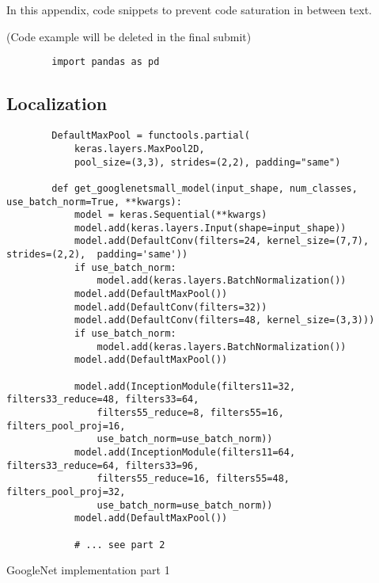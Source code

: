 \chapter{}%
\label{ch:code-snippets}


In this appendix, code snippets to prevent code saturation in between text.

(Code example will be deleted in the final submit)

\begin{listing}
    \begin{verbatim}
        import pandas as pd
    \end{verbatim}
    \caption[]{}
    \label{code:}
\end{listing}


\section{Localization}
\label{sec:code-localization}

\begin{listing}
    \begin{verbatim}
        DefaultMaxPool = functools.partial(
            keras.layers.MaxPool2D,
            pool_size=(3,3), strides=(2,2), padding="same")

        def get_googlenetsmall_model(input_shape, num_classes, use_batch_norm=True, **kwargs):
            model = keras.Sequential(**kwargs)
            model.add(keras.layers.Input(shape=input_shape))
            model.add(DefaultConv(filters=24, kernel_size=(7,7), strides=(2,2),  padding='same'))
            if use_batch_norm:
                model.add(keras.layers.BatchNormalization())
            model.add(DefaultMaxPool())
            model.add(DefaultConv(filters=32))
            model.add(DefaultConv(filters=48, kernel_size=(3,3)))
            if use_batch_norm:
                model.add(keras.layers.BatchNormalization())
            model.add(DefaultMaxPool())

            model.add(InceptionModule(filters11=32, filters33_reduce=48, filters33=64,
                filters55_reduce=8, filters55=16, filters_pool_proj=16,
                use_batch_norm=use_batch_norm))
            model.add(InceptionModule(filters11=64, filters33_reduce=64, filters33=96,
                filters55_reduce=16, filters55=48, filters_pool_proj=32,
                use_batch_norm=use_batch_norm))
            model.add(DefaultMaxPool())

            # ... see part 2
    \end{verbatim}
    \caption[GoogleNet implementation part 1]{GoogleNet implementation part 1}
    \label{code:keras-googlenet-small-replication}
\end{listing}

